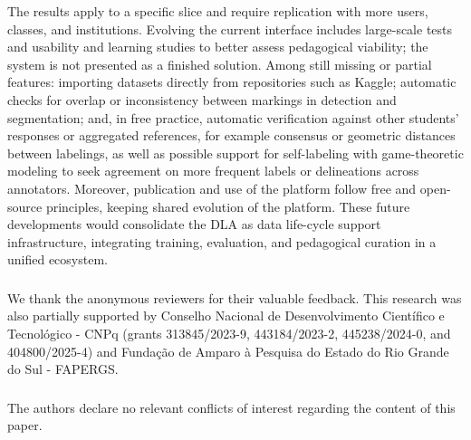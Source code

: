 \documentclass[runningheads]{llncs}
\begin{document}
The results apply to a specific slice and require replication with more users, classes, and institutions. Evolving the current interface includes large-scale tests and usability and learning studies to better assess pedagogical viability; the system is not presented as a finished solution. Among still missing or partial features: importing datasets directly from repositories such as Kaggle; automatic checks for overlap or inconsistency between markings in detection and segmentation; and, in free practice, automatic verification against other students' responses or aggregated references, for example consensus or geometric distances between labelings, as well as possible support for self-labeling with game-theoretic modeling to seek agreement on more frequent labels or delineations across annotators. Moreover, publication and use of the platform follow free and open-source principles, keeping shared evolution of the platform. These future developments would consolidate the DLA as data life-cycle support infrastructure, integrating training, evaluation, and pedagogical curation in a unified ecosystem.

\subsubsection{\ackname}
We thank the anonymous reviewers for their valuable feedback. This research was also partially supported by Conselho Nacional de Desenvolvimento Científico e Tecnológico - CNPq (grants 313845/2023-9, 443184/2023-2, 445238/2024-0, and 404800/2025-4) and Fundação de Amparo à Pesquisa do Estado do Rio Grande do Sul - FAPERGS.

\subsubsection{\discintname}
The authors declare no relevant conflicts of interest regarding the content of this paper.



\end{document}
